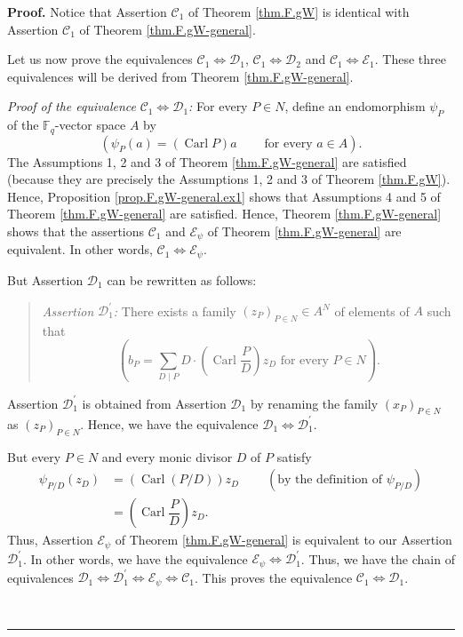 \documentclass[numbers=enddot,12pt,final,onecolumn,notitlepage]{scrartcl}%
\theoremstyle{definition}
\newenvironment{statement}{\begin{quote}}{\end{quote}}
\newenvironment{proof}[1][Proof]{\noindent\textbf{#1.} }{\ \rule{0.5em}{0.5em}}
\let\sumnonlimits\sum
\renewcommand{\sum}{\sumnonlimits\limits}
\begin{document}
\begin{proof}
Notice that Assertion $\mathcal{C}_{1}$ of Theorem \ref{thm.F.gW} is identical
with Assertion $\mathcal{C}_{1}$ of Theorem \ref{thm.F.gW-general}.

Let us now prove the equivalences $\mathcal{C}_{1}\Longleftrightarrow
\mathcal{D}_{1}$, $\mathcal{C}_{1}\Longleftrightarrow\mathcal{D}_{2}$ and
$\mathcal{C}_{1}\Longleftrightarrow\mathcal{E}_{1}$. These three equivalences
will be derived from Theorem \ref{thm.F.gW-general}.

\textit{Proof of the equivalence }$\mathcal{C}_{1}\Longleftrightarrow
\mathcal{D}_{1}$\textit{:} For every $P\in N$, define an endomorphism
$\psi_{P}$ of the $\mathbb{F}_{q}$-vector space $A$ by%
\[
\left(  \psi_{P}\left(  a\right)  =\left(  \operatorname*{Carl}P\right)
a\ \ \ \ \ \ \ \ \ \ \text{for every }a\in A\right)  .
\]
The Assumptions 1, 2 and 3 of Theorem \ref{thm.F.gW-general} are satisfied
(because they are precisely the Assumptions 1, 2 and 3 of Theorem
\ref{thm.F.gW}). Hence, Proposition \ref{prop.F.gW-general.ex1} shows that
Assumptions 4 and 5 of Theorem \ref{thm.F.gW-general} are satisfied. Hence,
Theorem \ref{thm.F.gW-general} shows that the assertions $\mathcal{C}_{1}$ and
$\mathcal{E}_{\psi}$ of Theorem \ref{thm.F.gW-general} are equivalent. In
other words, $\mathcal{C}_{1}\Longleftrightarrow\mathcal{E}_{\psi}$.

But Assertion $\mathcal{D}_{1}$ can be rewritten as follows:

\begin{statement}
\textit{Assertion }$\mathcal{D}_{1}^{\prime}$\textit{:} There exists a family
$\left(  z_{P}\right)  _{P\in N}\in A^{N}$ of elements of $A$ such that%
\[
\left(  b_{P}=\sum_{D\mid P}D\cdot\left(  \operatorname*{Carl}\dfrac{P}%
{D}\right)  z_{D}\text{ for every }P\in N\right)  .
\]

\end{statement}

Assertion $\mathcal{D}_{1}^{\prime}$ is obtained from Assertion $\mathcal{D}%
_{1}$ by renaming the family $\left(  x_{P}\right)  _{P\in N}$ as $\left(
z_{P}\right)  _{P\in N}$. Hence, we have the equivalence $\mathcal{D}%
_{1}\Longleftrightarrow\mathcal{D}_{1}^{\prime}$.

But every $P\in N$ and every monic divisor $D$ of $P$ satisfy%
\begin{align*}
\psi_{P/D}\left(  z_{D}\right)   &  =\left(  \operatorname*{Carl}\left(
P/D\right)  \right)  z_{D}\ \ \ \ \ \ \ \ \ \ \left(  \text{by the definition
of }\psi_{P/D}\right) \\
&  =\left(  \operatorname*{Carl}\dfrac{P}{D}\right)  z_{D}.
\end{align*}
Thus, Assertion $\mathcal{E}_{\psi}$ of Theorem \ref{thm.F.gW-general} is
equivalent to our Assertion $\mathcal{D}_{1}^{\prime}$. In other words, we
have the equivalence $\mathcal{E}_{\psi}\Longleftrightarrow\mathcal{D}%
_{1}^{\prime}$. Thus, we have the chain of equivalences $\mathcal{D}%
_{1}\Longleftrightarrow\mathcal{D}_{1}^{\prime}\Longleftrightarrow
\mathcal{E}_{\psi}\Longleftrightarrow\mathcal{C}_{1}$. This proves the
equivalence $\mathcal{C}_{1}\Longleftrightarrow\mathcal{D}_{1}$.


\end{proof}
\end{document}
